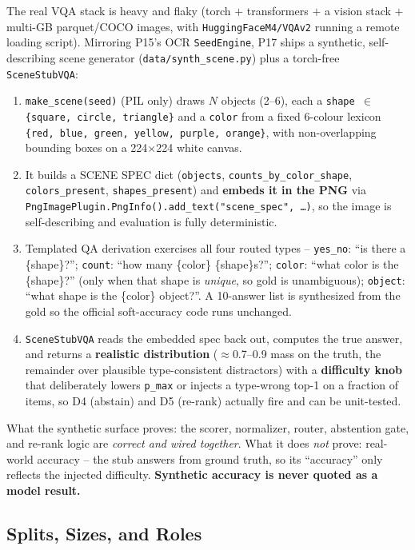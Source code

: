 \documentclass[12pt,a4paper]{article}
\begin{document}
The real VQA stack is heavy and flaky (torch $+$ transformers $+$ a vision stack $+$ multi-GB parquet/COCO images, with \texttt{HuggingFaceM4/VQAv2} running a remote loading script). Mirroring P15's OCR \texttt{SeedEngine}, P17 ships a synthetic, self-describing scene generator (\texttt{data/synth\_scene.py}) plus a torch-free \texttt{SceneStubVQA}:
\begin{enumerate}\setlength\itemsep{0.15em}
  \item \texttt{make\_scene(seed)} (PIL only) draws $N$ objects (2--6), each a \texttt{shape $\in$ \{square, circle, triangle\}} and a \texttt{color} from a fixed 6-colour lexicon \texttt{\{red, blue, green, yellow, purple, orange\}}, with non-overlapping bounding boxes on a 224$\times$224 white canvas.
  \item It builds a SCENE SPEC dict (\texttt{objects}, \texttt{counts\_by\_color\_shape}, \texttt{colors\_present}, \texttt{shapes\_present}) and \textbf{embeds it in the PNG} via \texttt{PngImagePlugin.PngInfo().add\_text("scene\_spec", \dots)}, so the image is self-describing and evaluation is fully deterministic.
  \item Templated QA derivation exercises all four routed types -- \texttt{yes\_no}: ``is there a \{shape\}?''; \texttt{count}: ``how many \{color\} \{shape\}s?''; \texttt{color}: ``what color is the \{shape\}?'' (only when that shape is \emph{unique}, so gold is unambiguous); \texttt{object}: ``what shape is the \{color\} object?''. A 10-answer list is synthesized from the gold so the official soft-accuracy code runs unchanged.
  \item \texttt{SceneStubVQA} reads the embedded spec back out, computes the true answer, and returns a \textbf{realistic distribution} ($\approx$0.7--0.9 mass on the truth, the remainder over plausible type-consistent distractors) with a \textbf{difficulty knob} that deliberately lowers \texttt{p\_max} or injects a type-wrong top-1 on a fraction of items, so D4 (abstain) and D5 (re-rank) actually fire and can be unit-tested.
\end{enumerate}
What the synthetic surface proves: the scorer, normalizer, router, abstention gate, and re-rank logic are \emph{correct and wired together}. What it does \emph{not} prove: real-world accuracy -- the stub answers from ground truth, so its ``accuracy'' only reflects the injected difficulty. \textbf{Synthetic accuracy is never quoted as a model result.}

\subsection{Splits, Sizes, and Roles}
\end{document}
